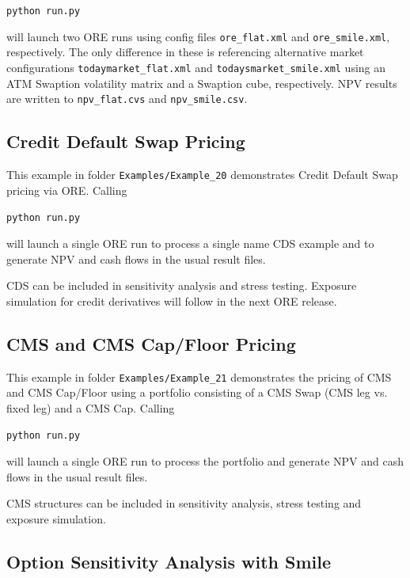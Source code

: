 \documentclass[12pt, a4paper]{article}
\begin{document}
{\medskip
\centerline{\tt python run.py}

\medskip
will launch two ORE runs using config files {\tt ore\_flat.xml} and {\tt ore\_smile.xml}, respectively. The only difference in these is referencing alternative market configurations {\tt todaymarket\_flat.xml} and {\tt todaysmarket\_smile.xml} using an ATM Swaption volatility matrix and a Swaption cube, respectively. NPV results are written to {\tt npv\_flat.cvs} and {\tt npv\_smile.csv}.

\subsection{Credit Default Swap Pricing}%

This example in folder {\tt Examples/Example\_20} demonstrates Credit Default Swap pricing via ORE. Calling

\medskip
\centerline{\tt python run.py}

\medskip
will launch a single ORE run to process a single name CDS example and to generate NPV and cash flows in the usual result files. 

\medskip
CDS can be included in sensitivity analysis and stress testing. Exposure simulation for credit derivatives will follow in the next ORE release.

\subsection{CMS and CMS Cap/Floor Pricing}%

This example in folder {\tt Examples/Example\_21} demonstrates the pricing of CMS and CMS Cap/Floor using a portfolio consisting of a CMS Swap (CMS leg vs. fixed leg) and a CMS Cap. Calling

\medskip
\centerline{\tt python run.py}

\medskip
will launch a single ORE run to process the portfolio and generate NPV and cash flows in the usual result files. 

\medskip
CMS structures can be included in sensitivity analysis, stress testing and exposure simulation. 

\subsection{Option Sensitivity Analysis with Smile}%

}
\end{document}
